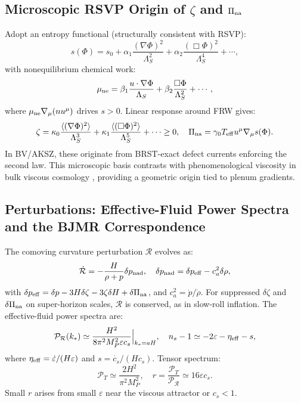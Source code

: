 \documentclass[12pt, a4paper, openany]{book}
\theoremstyle{definition}
\begin{document}
\subsection{Microscopic RSVP Origin of $\zeta$ and $\Pi_{\rm na}$}
Adopt an entropy functional (structurally consistent with RSVP):
\begin{equation}
s(\Phi) = s_0 + \alpha_1 \frac{(\nabla \Phi)^2}{\Lambda_S^2} + \alpha_2 \frac{(\Box \Phi)^2}{\Lambda_S^4} + \cdots,
\end{equation}
with nonequilibrium chemical work:
\begin{equation}
\mu_{\rm ne} = \beta_1 \frac{u \cdot \nabla \Phi}{\Lambda_S} + \beta_2 \frac{\Box \Phi}{\Lambda_S^2} + \cdots,
\end{equation}
where $\mu_{\rm ne} \nabla_\mu (n u^\mu)$ drives $s \dot{} > 0$. Linear response around FRW gives:
\begin{equation}
\zeta = \kappa_0 \frac{\langle (\nabla \Phi)^2 \rangle}{\Lambda_S^3} + \kappa_1 \frac{\langle (\Box \Phi)^2 \rangle}{\Lambda_S^5} + \cdots \ge 0, \quad \Pi_{\rm na} = \gamma_0 T_{\rm eff} u^\mu \nabla_\mu s(\Phi).
\end{equation}
In BV/AKSZ, these originate from BRST-exact defect currents enforcing the second law. This microscopic basis contrasts with phenomenological viscosity in bulk viscous cosmology \citep{Coley:2009}, providing a geometric origin tied to plenum gradients.

\subsection{Perturbations: Effective-Fluid Power Spectra and the BJMR Correspondence}
The comoving curvature perturbation $\mathcal{R}$ evolves as:
\begin{equation}
\dot{\mathcal{R}} = -\frac{H}{\rho + p} \delta p_{\rm nad}, \quad \delta p_{\rm nad} = \delta p_{\rm eff} - c_a^2 \delta \rho,
\end{equation}
with $\delta p_{\rm eff} = \delta p - 3 H \delta \zeta - 3 \zeta \delta H + \delta \Pi_{\rm na}$, and $c_a^2 = \dot{p}/\dot{\rho}$. For suppressed $\delta \zeta$ and $\delta \Pi_{\rm na}$ on super-horizon scales, $\mathcal{R}$ is conserved, as in slow-roll inflation. The effective-fluid power spectra are:
\begin{equation}
\mathcal{P}_{\mathcal{R}}(k_*) \simeq \frac{H^2}{8\pi^2 M_P^2 \varepsilon c_s} \Big|_{k_* = a H}, \quad n_s - 1 \simeq -2 \varepsilon - \eta_{\rm eff} - s,
\end{equation}
where $\eta_{\rm eff} = \dot{\varepsilon} / (H \varepsilon)$ and $s = \dot{c_s} / (H c_s)$. Tensor spectrum:
\begin{equation}
\mathcal{P}_T \simeq \frac{2 H^2}{\pi^2 M_P^2}, \quad r = \frac{\mathcal{P}_T}{\mathcal{P}_{\mathcal{R}}} \simeq 16 \varepsilon c_s.
\end{equation}
Small $r$ arises from small $\varepsilon$ near the viscous attractor or $c_s < 1$.
\end{document}
